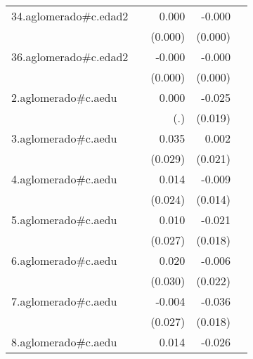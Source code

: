 {\begin{longtable}{l*{4}{D{.}{.}{-1}}}
\addlinespace
34.aglomerado#c.edad2&                     &       0.000         &      -0.000\sym{*}  &                     \\
            &                     &     (0.000)         &     (0.000)         &                     \\
\addlinespace
36.aglomerado#c.edad2&                     &      -0.000         &      -0.000\sym{**} &                     \\
            &                     &     (0.000)         &     (0.000)         &                     \\
\addlinespace
2.aglomerado#c.aedu&                     &       0.000         &      -0.025         &                     \\
            &                     &         (.)         &     (0.019)         &                     \\
\addlinespace
3.aglomerado#c.aedu&                     &       0.035         &       0.002         &                     \\
            &                     &     (0.029)         &     (0.021)         &                     \\
\addlinespace
4.aglomerado#c.aedu&                     &       0.014         &      -0.009         &                     \\
            &                     &     (0.024)         &     (0.014)         &                     \\
\addlinespace
5.aglomerado#c.aedu&                     &       0.010         &      -0.021         &                     \\
            &                     &     (0.027)         &     (0.018)         &                     \\
\addlinespace
6.aglomerado#c.aedu&                     &       0.020         &      -0.006         &                     \\
            &                     &     (0.030)         &     (0.022)         &                     \\
\addlinespace
7.aglomerado#c.aedu&                     &      -0.004         &      -0.036\sym{*}  &                     \\
            &                     &     (0.027)         &     (0.018)         &                     \\
\addlinespace
8.aglomerado#c.aedu&                     &       0.014         &      -0.026         &                     \\

\end{longtable}}
